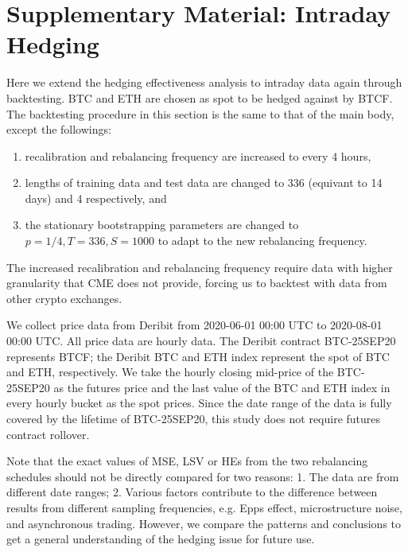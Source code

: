 \documentclass[11pt,a4paper,english]{article}
\providecommand{\natp}[1]{\textcolor{darkorange}{#1}}
\begin{document}

%





\clearpage
\section{Supplementary Material: Intraday Hedging}\label{sec:intraday}


Here we extend the hedging effectiveness analysis to intraday data again through backtesting.
BTC and ETH are chosen as spot to be hedged against by BTCF. 
The backtesting procedure in this section is the same to that of the main body, except the followings:
\begin{enumerate}
  \item recalibration and rebalancing frequency are increased to every 4 hours,
  \item lengths of training data and test data are changed to 336 (equivant to 14 days) and 4 respectively, and
  \item the stationary bootstrapping parameters are changed to $p=1/4, T=336, S=1000$ to adapt to the new rebalancing frequency. 
\end{enumerate}

The increased recalibration and rebalancing frequency require data with higher granularity that CME does not provide, 
forcing us to backtest with data from other crypto exchanges.

We collect price data from Deribit from 2020-06-01 00:00 UTC to 2020-08-01 00:00 UTC. 
All price data are hourly data.
The Deribit contract BTC-25SEP20 represents BTCF;
the Deribit BTC and ETH index represent the spot of BTC and ETH, respectively.
We take the hourly closing mid-price of the BTC-25SEP20 as the futures price and the last value of the BTC and ETH index in every hourly bucket as the spot prices.
Since the date range of the data is fully covered by the lifetime of BTC-25SEP20, this study does not require futures contract rollover.

Note that the exact values of MSE, LSV or HEs from the two rebalancing schedules should not be directly compared for two reasons: 1. The data are from different date ranges; 2. Various factors contribute to the difference between results from different sampling frequencies, e.g. Epps effect, microstructure noise,
and asynchronous trading.
However, we compare the patterns and conclusions to get a general understanding of the hedging issue for future use.
\end{document}
